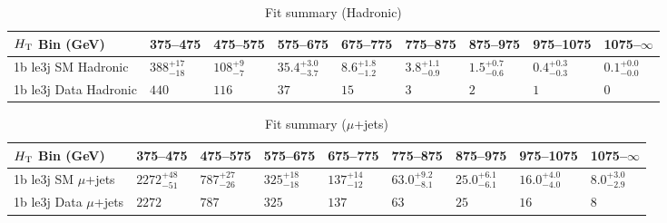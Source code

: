 \documentclass[8pt]{article}
\def\scalht{\mbox{$H_{\rm{T}}$}\xspace}
\newcommand\T{\rule{0pt}{2.6ex}}
\begin{document}
\begin{table}[ht!]
\caption{Fit summary (Hadronic)}
\label{tab:ensemble-summary}
\centering
\begin{tabular}{ lllllllll }

\hline
\scalht Bin (GeV)       & 375--475                       & 475--575                       & 575--675                       & 675--775                       & 775--875                       & 875--975                       & 975--1075                      & 1075--$\infty$                 \\ [1.000000ex]
\hline
1b le3j SM Hadronic\T   & $388^{+17}_{-18}$              & $108^{+9}_{-7}$                & $35.4^{+3.0}_{-3.7}$           & $8.6^{+1.8}_{-1.2}$            & $3.8^{+1.1}_{-0.9}$            & $1.5^{+0.7}_{-0.6}$            & $0.4^{+0.3}_{-0.3}$            & $0.1^{+0.0}_{-0.0}$            \\ 
1b le3j Data Hadronic\T & $440$                          & $116$                          & $37$                           & $15$                           & $3$                            & $2$                            & $1$                            & $0$                            \\ 
\hline

\end{tabular}
\end{table}
\begin{table}[ht!]
\caption{Fit summary ($\mu$+jets)}
\label{tab:ensemble-summary}
\centering
\begin{tabular}{ lllllllll }

\hline
\scalht Bin (GeV)       & 375--475                       & 475--575                       & 575--675                       & 675--775                       & 775--875                       & 875--975                       & 975--1075                      & 1075--$\infty$                 \\ [1.000000ex]
\hline
1b le3j SM $\mu$+jets\T & $2272^{+48}_{-51}$             & $787^{+27}_{-26}$              & $325^{+18}_{-18}$              & $137^{+14}_{-12}$              & $63.0^{+9.2}_{-8.1}$           & $25.0^{+6.1}_{-6.1}$           & $16.0^{+4.0}_{-4.0}$           & $8.0^{+3.0}_{-2.9}$            \\ 
1b le3j Data $\mu$+jets\T & $2272$                         & $787$                          & $325$                          & $137$                          & $63$                           & $25$                           & $16$                           & $8$                            \\ 
\hline

\end{tabular}
\end{table}
\end{document}
